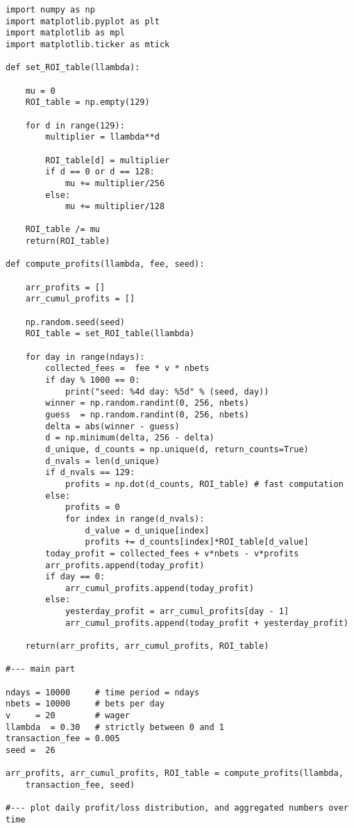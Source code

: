\documentclass[oneside,10pt]{book}
\begin{document}
\begin{lstlisting}
import numpy as np
import matplotlib.pyplot as plt
import matplotlib as mpl
import matplotlib.ticker as mtick

def set_ROI_table(llambda):

    mu = 0
    ROI_table = np.empty(129)

    for d in range(129):
        multiplier = llambda**d
    
        ROI_table[d] = multiplier
        if d == 0 or d == 128: 
            mu += multiplier/256
        else: 
            mu += multiplier/128

    ROI_table /= mu
    return(ROI_table)

def compute_profits(llambda, fee, seed):

    arr_profits = []
    arr_cumul_profits = []

    np.random.seed(seed)
    ROI_table = set_ROI_table(llambda)

    for day in range(ndays):
        collected_fees =  fee * v * nbets
        if day % 1000 == 0:
            print("seed: %4d day: %5d" % (seed, day)) 
        winner = np.random.randint(0, 256, nbets)
        guess  = np.random.randint(0, 256, nbets)
        delta = abs(winner - guess)
        d = np.minimum(delta, 256 - delta)
        d_unique, d_counts = np.unique(d, return_counts=True)
        d_nvals = len(d_unique)
        if d_nvals == 129: 
            profits = np.dot(d_counts, ROI_table) # fast computation
        else: 
            profits = 0
            for index in range(d_nvals):
                d_value = d_unique[index]
                profits += d_counts[index]*ROI_table[d_value]
        today_profit = collected_fees + v*nbets - v*profits
        arr_profits.append(today_profit)
        if day == 0:
            arr_cumul_profits.append(today_profit)
        else:
            yesterday_profit = arr_cumul_profits[day - 1]
            arr_cumul_profits.append(today_profit + yesterday_profit)

    return(arr_profits, arr_cumul_profits, ROI_table) 

#--- main part

ndays = 10000     # time period = ndays
nbets = 10000     # bets per day
v     = 20        # wager
llambda  = 0.30   # strictly between 0 and 1
transaction_fee = 0.005 
seed =  26  

arr_profits, arr_cumul_profits, ROI_table = compute_profits(llambda, 
    transaction_fee, seed)

#--- plot daily profit/loss distribution, and aggregated numbers over time


\end{lstlisting}
\end{document}
